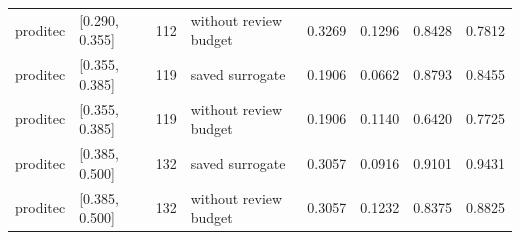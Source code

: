 \begin{tabular}{llrlrrrr}
proditec & [0.290, 0.355] & 112 & without review budget &        0.3269 & 0.1296 &          0.8428 &                0.7812 \\
proditec & [0.355, 0.385] & 119 &       saved surrogate &        0.1906 & 0.0662 &          0.8793 &                0.8455 \\
proditec & [0.355, 0.385] & 119 & without review budget &        0.1906 & 0.1140 &          0.6420 &                0.7725 \\
proditec & [0.385, 0.500] & 132 &       saved surrogate &        0.3057 & 0.0916 &          0.9101 &                0.9431 \\
proditec & [0.385, 0.500] & 132 & without review budget &        0.3057 & 0.1232 &          0.8375 &                0.8825 \\
\bottomrule
\end{tabular}
